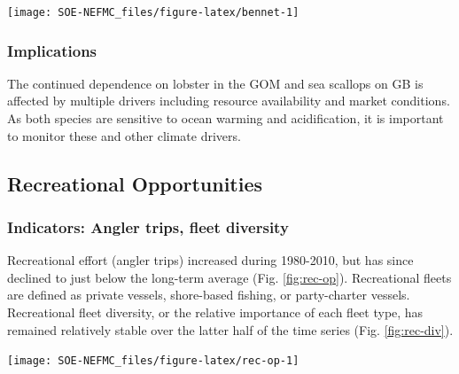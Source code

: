 \documentclass[
  10pt,
]{article}
\let\origfigure\figure
\let\endorigfigure\endfigure
\renewenvironment{figure}[1][2] {
    \expandafter\origfigure\expandafter[H]
} {
    \endorigfigure
}
\begin{document}
\begin{figure}

{\centering \texttt{[image: SOE-NEFMC\_files/figure-latex/bennet-1]} 

}

\caption{Revenue change from the long-term mean in 2015 dollars (black), price, and volume for commercial landings from Georges Bank (GB: top panels) and the Gulf of Maine (GOM: bottom panels)}\label{fig:bennet}
\end{figure}

\hypertarget{implications-1}{%
\subsubsection{Implications}\label{implications-1}}

The continued dependence on lobster in the GOM and sea scallops on GB is affected by multiple drivers including resource availability and market conditions. As both species are sensitive to ocean warming and acidification, it is important to monitor these and other climate drivers.

\hypertarget{recreational-opportunities}{%
\subsection{Recreational Opportunities}\label{recreational-opportunities}}

\hypertarget{indicators-angler-trips-fleet-diversity}{%
\subsubsection{Indicators: Angler trips, fleet diversity}\label{indicators-angler-trips-fleet-diversity}}

Recreational effort (angler trips) increased during 1980-2010, but has since declined to just below the long-term average (Fig. \ref{fig:rec-op}). Recreational fleets are defined as private vessels, shore-based fishing, or party-charter vessels. Recreational fleet diversity, or the relative importance of each fleet type, has remained relatively stable over the latter half of the time series (Fig. \ref{fig:rec-div}).

\begin{figure}

{\centering \texttt{[image: SOE-NEFMC\_files/figure-latex/rec-op-1]} 

}

\caption{Recreational effort in New England.}\label{fig:rec-op}
\end{figure}
\end{document}
